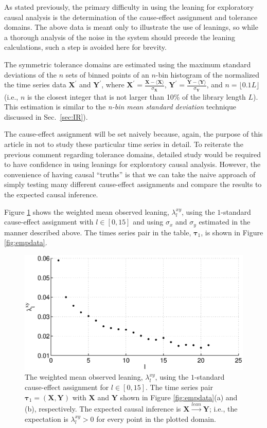 \documentclass[a4paper,11pt,twocolumn]{article}
\begin{document}
As stated previously, the primary difficulty in using the leaning for exploratory causal analysis is the determination of the cause-effect assignment and tolerance domains.  The above data is meant only to illustrate the use of leanings, so while a thorough analysis of the noise in the system should precede the leaning calculations, such a step is avoided here for brevity.  

The symmetric tolerance domains are estimated using the maximum standard deviations of the $n$ sets of binned points of an $n$-bin histogram of the normalized the time series data $\mathbf{X}^\prime$ and $\mathbf{Y}^\prime$, where $\mathbf{X}^\prime = \frac{\mathbf{X}-\langle \mathbf{X} \rangle}{\sigma_\mathbf{X}}$, $\mathbf{Y}^\prime = \frac{\mathbf{Y}-\langle \mathbf{Y} \rangle}{\sigma_\mathbf{Y}}$, and $n=\lfloor 0.1L\rfloor$ (i.e., $n$ is the closest integer that is not larger than 10\% of the library length $L$).  This estimation is similar to the {\em n-bin mean standard deviation} technique discussed in Sec.\ \ref{sec:IR}).

The cause-effect assignment will be set naively because, again, the purpose of this article in not to study these particular time series in detail.  To reiterate the previous comment regarding tolerance domains, detailed study would be required to have confidence in using leanings for exploratory causal analysis.  However, the convenience of having causal ``truths'' is that we can take the naive approach of simply testing many different cause-effect assignments and compare the results to the expected causal inference.

Figure \ref{fig:emp} shows the weighted mean observed leaning, $\lambda_l^{xy}$, using the $1$-standard cause-effect assignment with $l\in[0,15]$ and using $\sigma_x$ and $\sigma_y$ estimated in the manner described above.  The times series pair in the table, $\mathbf{\tau}_1$, is shown in Figure \ref{fig:empdata}.  
\begin{figure}
\includegraphics[scale=0.45]{EmpiricalData_p87leans.eps}
\caption{The weighted mean observed leaning, $\lambda_l^{xy}$, using the $1$-standard cause-effect assignment for $l\in[0,15]$.  The time series pair $\mathbf{\tau}_1 = (\mathbf{X},\mathbf{Y})$ with $\mathbf{X}$ and $\mathbf{Y}$ shown in Figure \ref{fig:empdata}(a) and (b), respectively.  The expected causal inference is $\mathbf{X}\xrightarrow{lean}\mathbf{Y}$; i.e., the expectation is $\lambda_l^{xy} > 0$ for every point in the plotted domain.}
\label{fig:emp}
\end{figure}
\end{document}
